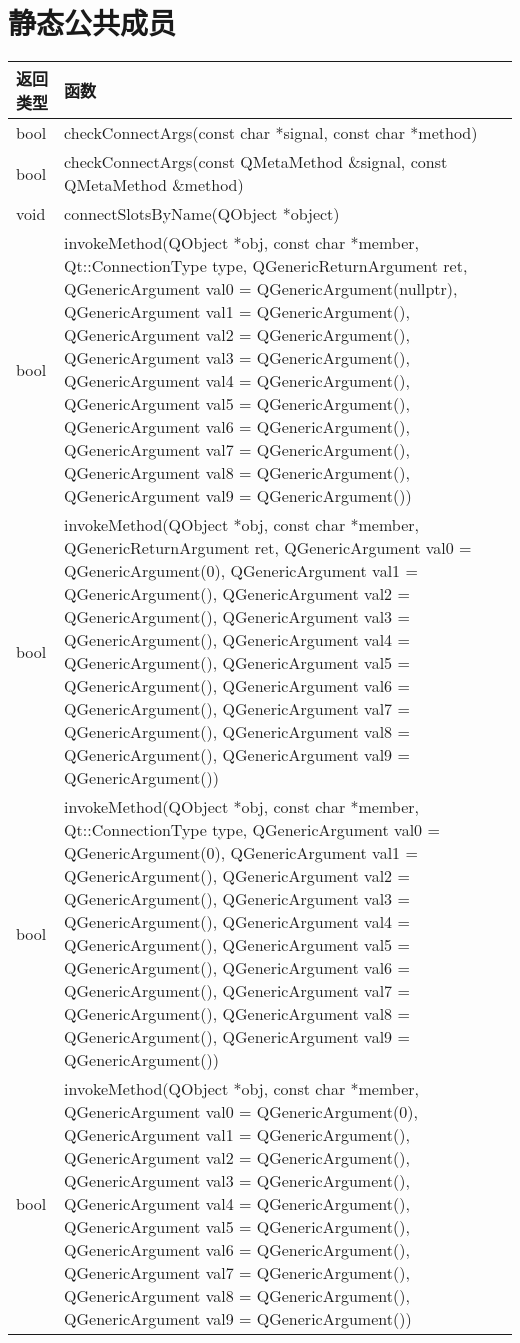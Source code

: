 \section{静态公共成员}

\begin{longtable}{|l|m{28em}|}
\hline
返回类型 &	函数 \\ 
\hline
bool	&checkConnectArgs(const char *signal, const char *method) \\
\hline
bool	&checkConnectArgs(const QMetaMethod \&signal, const QMetaMethod \&method) \\
\hline
void	&connectSlotsByName(QObject *object) \\
\hline
bool	&invokeMethod(QObject *obj, const char *member, Qt::ConnectionType type, QGenericReturnArgument ret, QGenericArgument val0 = QGenericArgument(nullptr), QGenericArgument val1 = QGenericArgument(), QGenericArgument val2 = QGenericArgument(), QGenericArgument val3 = QGenericArgument(), QGenericArgument val4 = QGenericArgument(), QGenericArgument val5 = QGenericArgument(), QGenericArgument val6 = QGenericArgument(), QGenericArgument val7 = QGenericArgument(), QGenericArgument val8 = QGenericArgument(), QGenericArgument val9 = QGenericArgument())\\
\hline
bool	&invokeMethod(QObject *obj, const char *member, QGenericReturnArgument ret, QGenericArgument val0 = QGenericArgument(0), QGenericArgument val1 = QGenericArgument(), QGenericArgument val2 = QGenericArgument(), QGenericArgument val3 = QGenericArgument(), QGenericArgument val4 = QGenericArgument(), QGenericArgument val5 = QGenericArgument(), QGenericArgument val6 = QGenericArgument(), QGenericArgument val7 = QGenericArgument(), QGenericArgument val8 = QGenericArgument(), QGenericArgument val9 = QGenericArgument())\\
\hline
bool	&invokeMethod(QObject *obj, const char *member, Qt::ConnectionType type, QGenericArgument val0 = QGenericArgument(0), QGenericArgument val1 = QGenericArgument(), QGenericArgument val2 = QGenericArgument(), QGenericArgument val3 = QGenericArgument(), QGenericArgument val4 = QGenericArgument(), QGenericArgument val5 = QGenericArgument(), QGenericArgument val6 = QGenericArgument(), QGenericArgument val7 = QGenericArgument(), QGenericArgument val8 = QGenericArgument(), QGenericArgument val9 = QGenericArgument())\\
\hline
bool	&invokeMethod(QObject *obj, const char *member, QGenericArgument val0 = QGenericArgument(0), QGenericArgument val1 = QGenericArgument(), QGenericArgument val2 = QGenericArgument(), QGenericArgument val3 = QGenericArgument(), QGenericArgument val4 = QGenericArgument(), QGenericArgument val5 = QGenericArgument(), QGenericArgument val6 = QGenericArgument(), QGenericArgument val7 = QGenericArgument(), QGenericArgument val8 = QGenericArgument(), QGenericArgument val9 = QGenericArgument())\\

\end{longtable}
